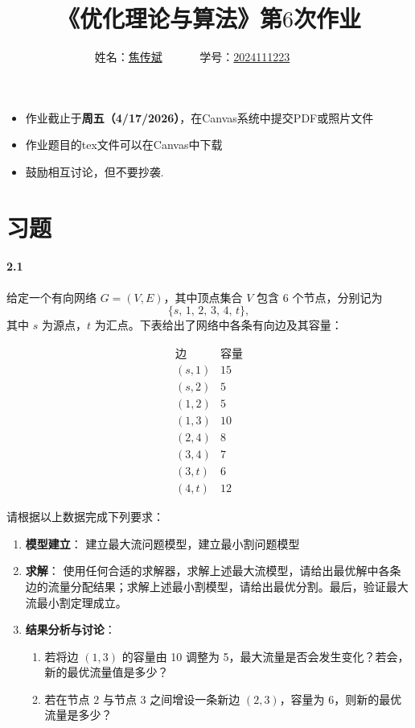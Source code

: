 \documentclass[12pt,a4paper]{article}
\begin{document}
\title{
{《优化理论与算法》第$6$次作业
}
}
\date{}

 \author{
 姓名：\underline{焦传斌}~~~~~~
 学号：\underline{2024111223}~~~~~~}

\maketitle
\begin{itemize}
	\item 作业截止于{\bf 周五（4/17/2026）}，在Canvas系统中提交PDF或照片文件
	\item 作业题目的tex文件可以在Canvas中下载
	\item 鼓励相互讨论，但不要抄袭.
\end{itemize}


\section{习题}


\paragraph{2.1}
给定一个有向网络 $G=(V,E)$，其中顶点集合 $V$ 包含 $6$ 个节点，分别记为
\[
\{s,\,1,\,2,\,3,\,4,\,t\},
\]
其中 $s$ 为源点，$t$ 为汇点。下表给出了网络中各条有向边及其容量：

\[
\begin{array}{c|cc}
\textbf{边} & \textbf{容量} \\ \hline
(s,1) & 15 \\
(s,2) & 5 \\
(1,2) & 5 \\
(1,3) & 10 \\
(2,4) & 8 \\
(3,4) & 7 \\
(3,t) & 6 \\
(4,t) & 12
\end{array}
\]

请根据以上数据完成下列要求：

\begin{enumerate}
  \item \textbf{模型建立}：  
  建立最大流问题模型，建立最小割问题模型

  \item \textbf{求解}：  
  使用任何合适的求解器，求解上述最大流模型，请给出最优解中各条边的流量分配结果；求解上述最小割模型，请给出最优分割。最后，验证最大流最小割定理成立。
  

  \item \textbf{结果分析与讨论}：
  \begin{enumerate}
    \item 若将边 $(1,3)$ 的容量由 10 调整为 5，最大流量是否会发生变化？若会，新的最优流量值是多少？  
    \item 若在节点 $2$ 与节点 $3$ 之间增设一条新边 $(2,3)$，容量为 6，则新的最优流量是多少？  
  \end{enumerate}
\end{enumerate}
\end{document}

